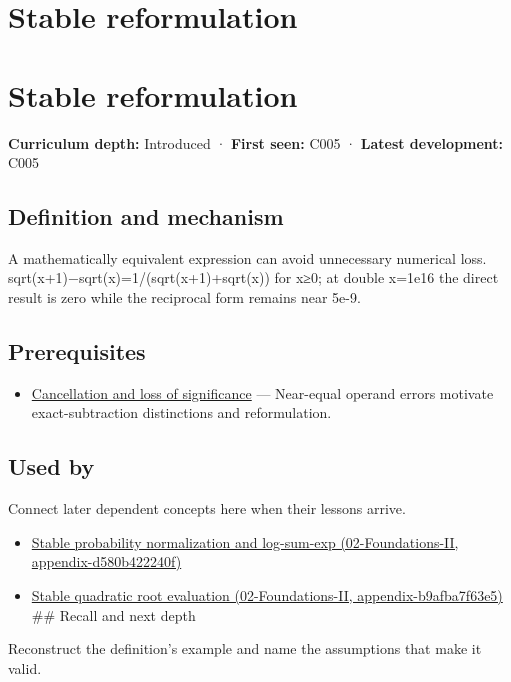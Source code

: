 \hypertarget{appendix-d7f8ba961670}{}
\section*{Stable reformulation}
\section{Stable reformulation}\label{stable-reformulation}

\textbf{Curriculum depth:} Introduced · \textbf{First seen:} C005 · \textbf{Latest development:} C005

\subsection{Definition and mechanism}\label{definition-and-mechanism}

A mathematically equivalent expression can avoid unnecessary numerical loss. sqrt(x+1)−sqrt(x)=1/(sqrt(x+1)+sqrt(x)) for x≥0; at double x=1e16 the direct result is zero while the reciprocal form remains near 5e-9.

\subsection{Prerequisites}\label{prerequisites}

\begin{itemize}
\tightlist
\item
  \hyperref[appendix-a2773a6a2f9d]{Cancellation and loss of significance} --- Near-equal operand errors motivate exact-subtraction distinctions and reformulation.
\end{itemize}

\subsection{Used by}\label{used-by}

Connect later dependent concepts here when their lessons arrive.

\begin{itemize}
\tightlist
\item
  \href{}{Stable probability normalization and log-sum-exp (02-Foundations-II, appendix-d580b422240f)}
\item
  \href{}{Stable quadratic root evaluation (02-Foundations-II, appendix-b9afba7f63e5)} \#\# Recall and next depth
\end{itemize}

Reconstruct the definition's example and name the assumptions that make it valid.

